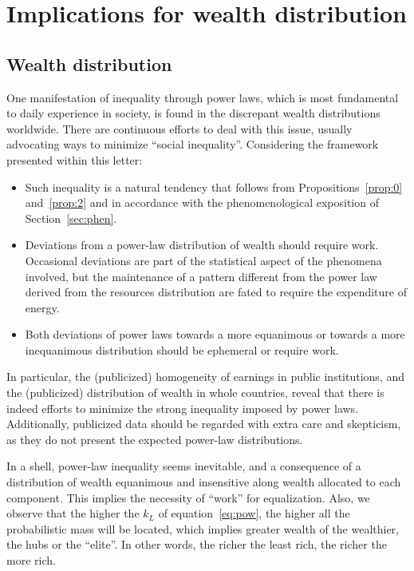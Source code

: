\documentclass[a4paper, 11pt]{article} %
\begin{document}
\section{Implications for wealth distribution}\label{sec:esp}

\subsection{Wealth distribution}
One manifestation of inequality through power laws,
which is most fundamental to daily experience
in society, is found in the discrepant wealth distributions worldwide.
There are continuous efforts to deal with this issue,
usually advocating ways to minimize ``social inequality''.
Considering the framework presented within this letter:

\begin{itemize}
	\item Such inequality is a natural tendency that follows from Propositions~\ref{prop:0} and~\ref{prop:2} and in accordance with the phenomenological exposition of Section~\ref{sec:phen}.
	\item Deviations from a power-law distribution of wealth should require work.
		Occasional deviations are part of the statistical aspect of the phenomena involved, but the maintenance of a pattern different from the power law derived from the resources distribution are fated to require the expenditure of energy.
	\item Both deviations of power laws towards a more equanimous or towards a more inequanimous distribution should be ephemeral or require work.
\end{itemize}

In particular, the (publicized)
homogeneity of earnings in public institutions,
and the (publicized) distribution of wealth in whole countries,
reveal that there is indeed efforts to minimize
the strong inequality imposed by power laws.
Additionally, publicized data should be regarded with
extra care and skepticism, as they do not present the
expected power-law distributions.

In a shell, power-law inequality seems inevitable,
and a consequence of a distribution of wealth equanimous and insensitive
along wealth allocated to each component.
This implies the necessity of ``work'' for equalization.
Also, we observe that the higher the $k_L$ of equation~\ref{eq:pow}, the higher all the probabilistic mass will be located, which
implies greater wealth of the wealthier, the hubs or the ``elite''.
In other words, the richer the least rich,
the richer the more rich.
\end{document}
